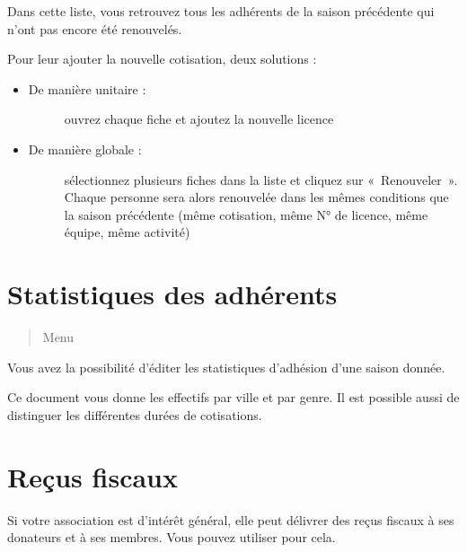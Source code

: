 \documentclass[a4paper,10pt,oneside,french]{sphinxmanual}
\begin{document}
\sphinxAtStartPar
Dans cette liste, vous retrouvez tous les adhérents de la saison précédente qui n’ont pas encore été renouvelés.

\sphinxAtStartPar
Pour leur ajouter la nouvelle cotisation, deux solutions :
\begin{itemize}
\item {} \begin{description}
\item[{De manière unitaire :}] \leavevmode
\sphinxAtStartPar
ouvrez chaque fiche et ajoutez la nouvelle licence

\end{description}

\item {} \begin{description}
\item[{De manière globale :}] \leavevmode
\sphinxAtStartPar
sélectionnez plusieurs fiches dans la liste et cliquez sur « Renouveler ». Chaque personne sera alors renouvelée dans les mêmes conditions que la saison précédente (même cotisation, même N° de licence, même équipe, même activité)

\end{description}

\end{itemize}


\section{Statistiques des adhérents}
\label{\detokenize{member/statistic:statistiques-des-adherents}}\label{\detokenize{member/statistic::doc}}\begin{quote}

\sphinxAtStartPar
Menu 
\end{quote}

\noindent{}

\sphinxAtStartPar
Vous avez la possibilité d’éditer les statistiques d’adhésion d’une saison donnée.

\sphinxAtStartPar
Ce document vous donne les effectifs par ville et par genre. Il est possible aussi de distinguer les différentes durées de cotisations.


\section{Reçus fiscaux}
\label{\detokenize{member/taxreceipt:recus-fiscaux}}\label{\detokenize{member/taxreceipt::doc}}
\sphinxAtStartPar
Si votre association est d’intérêt général, elle peut délivrer des reçus fiscaux à ses donateurs et à ses membres. Vous pouvez utiliser  pour cela.
\end{document}
